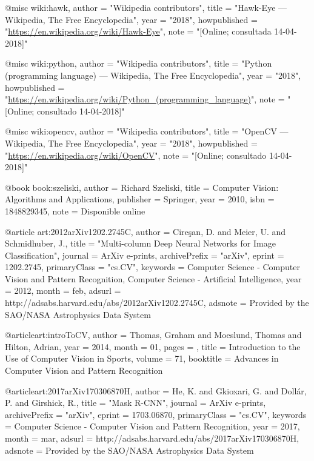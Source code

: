 @misc{ wiki:hawk,
    author = "{Wikipedia contributors}",
    title = "Hawk-Eye --- {Wikipedia}{,} The Free Encyclopedia",
    year = "2018",
    howpublished = "\url{https://en.wikipedia.org/wiki/Hawk-Eye}",
    note = "[Online; consultada 14-04-2018]"
}
  
  
@misc{ wiki:python,
    author = "{Wikipedia contributors}",
    title = "Python (programming language) --- {Wikipedia}{,} The Free Encyclopedia",
    year = "2018",
    howpublished = "\url{https://en.wikipedia.org/wiki/Python_(programming_language)}",
    note = "[Online; consultado 14-04-2018]"
}
  
  
@misc{ wiki:opencv,
    author = "{Wikipedia contributors}",
    title = "OpenCV --- {Wikipedia}{,} The Free Encyclopedia",
    year = "2018",
    howpublished = "\url{https://en.wikipedia.org/wiki/OpenCV}",
    note = "[Online; consultado 14-04-2018]"
}
  
@book{ book:szeliski,
	author = {Richard Szeliski},
	title = {Computer Vision: Algorithms and Applications},
	publisher = {Springer},
	year = {2010},
	isbn = {1848829345},
	note = {Disponible online}
}

@article{ art:2012arXiv1202.2745C,
    author = {{Cire{\c s}an}, D. and {Meier}, U. and {Schmidhuber}, J.},
    title = "{Multi-column Deep Neural Networks for Image Classification}",
    journal = {ArXiv e-prints},
    archivePrefix = "arXiv",
    eprint = {1202.2745},
    primaryClass = "cs.CV",
    keywords = {Computer Science - Computer Vision and Pattern Recognition, Computer Science - Artificial Intelligence},
    year = 2012,
    month = feb,
    adsurl = {http://adsabs.harvard.edu/abs/2012arXiv1202.2745C},
    adsnote = {Provided by the SAO/NASA Astrophysics Data System}
}

@article{art:introToCV,
    author = {Thomas, Graham and Moeslund, Thomas and Hilton, Adrian},
    year = {2014},
    month = {01},
    pages = {},
    title = {Introduction to the Use of Computer Vision in Sports},
    volume = {71},
    booktitle = {Advances in Computer Vision and Pattern Recognition}
}

@article{art:2017arXiv170306870H,
    author = {{He}, K. and {Gkioxari}, G. and {Doll{\'a}r}, P. and {Girshick}, R.},
    title = "{Mask R-CNN}",
    journal = {ArXiv e-prints},
    archivePrefix = "arXiv",
    eprint = {1703.06870},
    primaryClass = "cs.CV",
    keywords = {Computer Science - Computer Vision and Pattern Recognition},
    year = 2017,
    month = mar,
    adsurl = {http://adsabs.harvard.edu/abs/2017arXiv170306870H},
    adsnote = {Provided by the SAO/NASA Astrophysics Data System}
}

